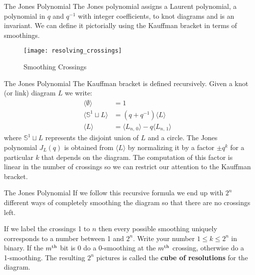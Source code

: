 \documentclass{beamer}
\begin{document}
    \begin{frame}{The Jones Polynomial}
        The Jones polynomial assigns a Laurent polynomial, a polynomial in
        $q$ and $q^{-1}$ with integer coefficients, to knot diagrams and is
        an invariant. We can define it pictorially using the Kauffman bracket
        in terms of smoothings.
        \begin{figure}
            \centering
            \texttt{[image: resolving\_crossings]}
            \caption{Smoothing Crossings}
        \end{figure}
    \end{frame}
    \begin{frame}{The Jones Polynomial}
        The Kauffman bracket is defined recursively. Given a knot (or link)
        diagram $L$ we write:
        \begin{align}
            \langle{\emptyset}\rangle
            &=1\\
            \langle{\mathbb{S}^{1}\sqcup{L}}\rangle
            &=(q+q^{-1})\langle{L}\rangle\\
            \langle{L}\rangle
            &=\langle{L_{n,\,0}}\rangle-q\langle{L_{n,\,1}}\rangle
        \end{align}
        where $\mathbb{S}^{1}\sqcup{L}$ represents the disjoint union of $L$
        and a circle. The Jones polynomial $J_{L}(q)$ is obtained from
        $\langle{L}\rangle$ by normalizing it by a factor
        $\pm{q}^{k}$ for a particular $k$ that depends on the diagram. The
        computation of this factor is linear in the number of crossings so we
        can restrict our attention to the Kauffman bracket.
    \end{frame}
    \begin{frame}{The Jones Polynomial}
        If we follow this recursive formula we end up with $2^{n}$ different
        ways of completely smoothing the diagram so that there are no crossings
        left.
        \par\hfill\par
        If we label the crossings 1 to $n$ then every possible smoothing
        uniquely corresponds to a number between 1 and $2^{n}$. Write your
        number $1\leq{k}\leq{2}^{n}$ in binary. If the $m^{\small\textrm{th}}$
        bit is 0 do a 0-smoothing at the $m^{\small\textrm{th}}$ crossing,
        otherwise do a 1-smoothing. The resulting
        $2^{n}$ pictures is called the \textbf{cube of resolutions} for the
        diagram.
    \end{frame}
\end{document}

